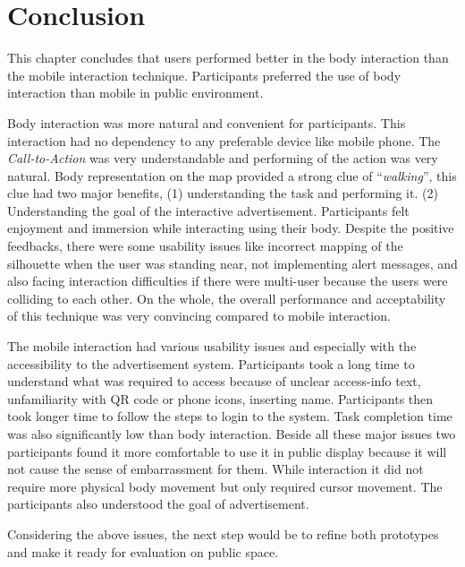 \section{Conclusion}
This chapter concludes that users performed better in the body interaction than the mobile interaction technique. Participants preferred the use of body interaction than mobile in public environment.

Body interaction was more natural and convenient for participants. This interaction had no dependency to any preferable device like mobile phone. The \emph{Call-to-Action} was very understandable and performing of the action was very natural. Body representation on the map provided a strong clue of ``\emph{walking}'', this clue had two major benefits, (1) understanding the task and performing it. (2) Understanding the goal of the interactive advertisement. Participants felt enjoyment and immersion while interacting using their body. Despite the positive feedbacks, there were some usability issues like incorrect mapping of the silhouette when the user was standing near, not implementing alert messages, and also facing interaction difficulties if there were multi-user because the users were colliding to each other. On the whole, the overall performance and acceptability of this technique was very convincing compared to mobile interaction.


The mobile interaction had various usability issues and especially with the accessibility to the advertisement system. Participants took a long time to understand what was required to access because of unclear access-info text, unfamiliarity with QR code or phone icons, inserting name. Participants then took longer time to follow the steps to login to the system. Task completion time was also significantly low than body interaction.  Beside all these major issues two participants found it more comfortable to use it in public display because it will not cause the sense of embarrassment for them. While interaction it did not require more physical body movement but only required cursor movement. The participants also understood the goal of advertisement.

Considering the above issues, the next step would be to refine both prototypes and make it ready for evaluation on public space.
















